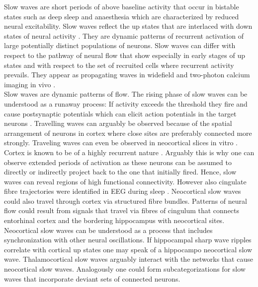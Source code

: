 Slow waves are short periods of above baseline activity that occur in bistable states such as deep sleep and anaesthesia which are characterized by reduced neural excitability. Slow waves reflect the up states that are interlaced with down states of neural activity \parencite{jercog2017up}. They are dynamic patterns of recurrent activation of large potentially distinct populations of neurons. Slow waves can differ with respect to the pathway of neural flow that show especially in early stages of up states and with respect to the set of recruited cells where recurrent activity prevails. They appear as propagating waves in widefield and two-photon calcium imaging in vivo \parencite{celotto2020analysis, niethard2018cortical}.\\
Slow waves are dynamic patterns of flow. The rising phase of slow waves can be understood as a runaway process: If activity exceeds the threshold they fire and cause postsynaptic potentials which can elicit action potentials in the target neurons \parencite{nghiem2018two}. Travelling waves can arguably be observed because of the spatial arrangement of neurons in cortex where close sites are preferably connected more strongly. Traveling waves can even be observed in neocortical slices in vitro \parencite{wu2008propagating}. Cortex is known to be of a highly recurrent nature \parencite{guamuanuct2017mouse}. Arguably this is why one can observe extended periods of activation as these neurons can be assumed to directly or indirectly project back to the one that initially fired. Hence, slow waves can reveal regions of high functional connectivity. However also cingulate fibre trajectories were identified in EEG during sleep \parencite{murphy2009source}. Neocortical slow waves could also travel through cortex via structured fibre bundles. Patterns of neural flow could result from signals that travel via fibres of cingulum that connects entorhinal cortex and the bordering hippocampus with neocortical sites.\\
Neocortical slow waves can be understood as a process that includes synchronization with other neural oscillations. If hippocampal sharp wave ripples correlate with cortical up states one may speak of a hippocampo neocortical slow wave. Thalamocortical slow waves arguably interact with the networks that cause neocortical slow waves. Analogously one could form subcategorizations for slow waves that incorporate deviant sets of connected neurons.\\
